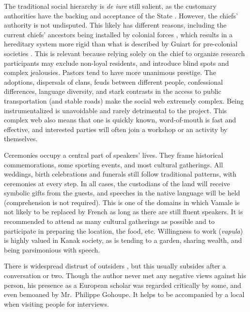 The traditional social hierarchy is \textit{de iure} still salient, as the customary authorities have the backing and acceptance of the State \parencite[2]{demmer_nationalisme_2003}. However, the chiefs' authority is not undisputed. This likely has different reasons, including the current chiefs' ancestors being installed by colonial forces \parencite[3]{demmer_nationalisme_2003}, which results in a hereditary system more rigid than what is described by Guiart for pre-colonial societies \parencite[5,8]{guiart_lorganisation_1954}. This is relevant because relying solely on the chief to organize research participants may exclude non-loyal residents, and introduce blind spots and complex jealousies. Pastors tend to have more unanimous prestige. %
The adoptions, dispersals of clans, feuds between different people, confessional differences, language diversity, and stark contrasts in the access to public transportation (and stable roads) make the social web extremely complex. Being instrumentalized is unavoidable and rarely detrimental to the project. This complex web also means that one is quickly known, word-of-mouth is fast and effective, and interested parties will often join a workshop or an activity by themselves.%

Ceremonies occupy a central part of speakers' lives. They frame historical commemorations, some sporting events, and most cultural gatherings. All weddings, birth celebrations and funerals still follow traditional patterns, with ceremonies at every step. In all cases, the custodians of the land will receive symbolic gifts from the guests, and speeches in the native language will be held (comprehension is not required). This is one of the domains in which Vamale is not likely to be replaced by French as long as there are still fluent speakers. It is recommended to attend as many cultural gatherings as possible and to participate in preparing the location, the food, etc. Willingness to work (\textit{vapula}) is highly valued in Kanak society, as is tending to a garden, sharing wealth, and being parsimonious with speech.

There is widespread distrust of outsiders%
, but this usually subsides after a conversation or two. Though the author never met any negative views against his person, his presence as a European scholar was regarded critically by some, and even bemoaned by Mr.\ Philippe Gohoupe. It helps to be accompanied by a local when visiting people for interviews.%


